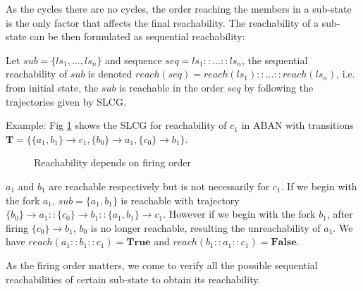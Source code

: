 \documentclass[runningheads]{llncs}
\newcommand{\acm}[3]{\{#1\}\rightarrow#3}
\begin{document}
As the cycles there are no cycles, the order reaching the members in a sub-state is the only factor that affects the final reachability. 
The reachability of a sub-state can be then formulated as sequential reachability:
\begin{definition}
Let $sub=\{ls_1,\ldots,ls_n\}$ and sequence $seq=ls_1::\ldots::ls_n$, the sequential reachability of $sub$ is denoted $reach (seq)=reach (ls_1)::\ldots::reach (ls_n)$, i.e. from initial state, the $sub$ is reachable in the order $seq$ by following the trajectories given by SLCG.
\end{definition}

Example: Fig \ref{fig:5} shows the SLCG for reachability of $c_1$ in ABAN with transitions $\mathbf{T}=\{\acm{a_1,b_1}{c_0}{c_1},\acm{b_0}{a_0}{a_1},\acm{c_0}{b_0}{b_1}\}$.
\begin{figure}[ht]
\centering

\caption{Reachability depends on firing order}
\label{fig:5}
\end{figure}

$a_1$ and $b_1$ are reachable respectively but is not necessarily for $c_1$.
If we begin with the fork $a_1$, $sub=\{a_1,b_1\}$ is reachable with trajectory $\acm{b_0}{a_0}{a_1}::\acm{c_0}{b_0}{b_1}::\acm{a_1,b_1}{c_0}{c_1}$. 
However if we begin with the fork $b_1$, after firing $\acm{c_0}{b_0}{b_1}$, $b_0$ is no longer reachable, resulting the unreachability of $a_1$.
We have $reach (a_1::b_1::c_1)=\mathbf{True}$ and $reach (b_1::a_1::c_1)=\mathbf{False}$.

As the firing order matters, we come to verify all the possible sequential reachabilities of certain sub-state to obtain its reachability.
\end{document}
